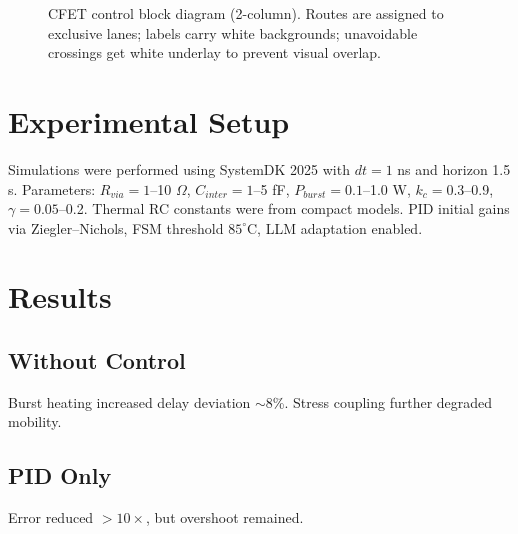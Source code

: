 \documentclass[conference]{IEEEtran}
\begin{document}
\begin{figure}[!t]
{%
} %
\caption{CFET control block diagram (2-column). Routes are assigned to exclusive lanes; labels carry white backgrounds; unavoidable crossings get white underlay to prevent visual overlap.}
\label{fig:model_tikz}
\end{figure}

\section{Experimental Setup}
Simulations were performed using SystemDK 2025 with $dt=1$ ns and horizon 1.5 s. Parameters:  
$R_{via}=1$--10 $\Omega$, $C_{inter}=1$--5 fF, $P_{burst}=0.1$--1.0 W, $k_c=0.3$--0.9, $\gamma=0.05$--0.2.  
Thermal RC constants were from compact models. PID initial gains via Ziegler–Nichols, FSM threshold $85^\circ$C, LLM adaptation enabled.

\section{Results}
\subsection{Without Control}
Burst heating increased delay deviation $\sim$8\%. Stress coupling further degraded mobility.  
\subsection{PID Only}
Error reduced $>10\times$, but overshoot remained.  
\end{document}
